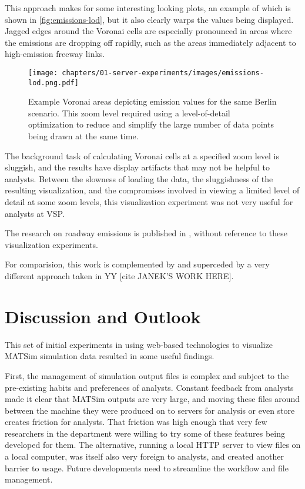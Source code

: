 This approach makes for some interesting looking plots, an example of which is shown in \autoref{fig:emissions-lod}, but it also clearly warps the values being displayed. Jagged edges around the Voronai cells are especially pronounced in areas where the emissions are dropping off rapidly, such as the areas immediately adjacent to high-emission freeway links.

\begin{figure}[!ht]
  \texttt{[image: chapters/01-server-experiments/images/emissions-lod.png.pdf]}
  \caption{Example Voronai areas depicting emission values for the same Berlin scenario. This zoom level required using a level-of-detail optimization to reduce and simplify the large number of data points being drawn at the same time.}
  \label{fig:emissions-lod}
\end{figure}

The background task of calculating Voronai cells at a specified zoom level is sluggish, and the results have display artifacts that may not be helpful to analysts. Between the slowness of loading the data, the sluggishness of the resulting visualization, and the compromises involved in viewing a limited level of detail at some zoom levels, this visualization experiment was not very useful for analysts at VSP.

The research on roadway emissions is published in \cite{kaddoura2022exhaust}, without reference to these visualization experiments.

For comparision, this work is complemented by and superceded by a very different approach taken in YY [cite JANEK'S WORK HERE].

\hypertarget{server-experiments-findings}{%
\section{Discussion and Outlook}\label{server-experiments-findings}}

This set of initial experiments in using web-based technologies to visualize MATSim simulation data resulted in some useful findings.

First, the management of simulation output files is complex and subject to the pre-existing habits and preferences of analysts. Constant feedback from analysts made it clear that MATSim outputs are very large, and moving these files around between the machine they were produced on to servers for analysis or even store creates friction for analysts. That friction was high enough that very few researchers in the department were willing to try some of these features being developed for them. The alternative, running a local HTTP server to view files on a local computer, was itself also very foreign to analysts, and created another barrier to usage. Future developments need to streamline the workflow and file management.

